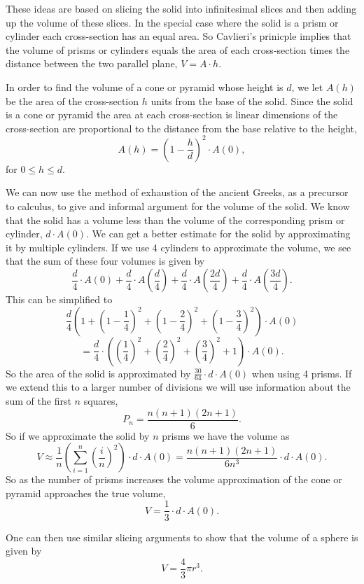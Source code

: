 \documentclass[
]{book}
\theoremstyle{definition}
\theoremstyle{definition}
\theoremstyle{definition}
\theoremstyle{definition}
\theoremstyle{remark}
\begin{document}
These ideas are based on slicing the solid into infinitesimal slices and then adding up the volume of these slices. In the special case where the solid is a prism or cylinder each cross-section has an equal area. So Cavlieri's prinicple implies that the volume of prisms or cylinders equals the area of each cross-section times the distance between the two parallel plane, \(V= A \cdot h\).

In order to find the volume of a cone or pyramid whose height is \(d\), we let \(A(h)\) be the area of the cross-section \(h\) units from the base of the solid. Since the solid is a cone or pyramid the area at each cross-section is linear dimensions of the cross-section are proportional to the distance from the base relative to the height, \[A(h) = \left( 1 - \frac{h}{d}\right)^2 \cdot A(0),\] for \(0\leq h \leq d\).

We can now use the method of exhaustion of the ancient Greeks, as a precursor to calculus, to give and informal argument for the volume of the solid. We know that the solid has a volume less than the volume of the corresponding prism or cylinder, \(d \cdot A(0)\). We can get a better estimate for the solid by approximating it by multiple cylinders. If we use 4 cylinders to approximate the volume, we see that the sum of these four volumes is given by
\[\frac{d}{4} \cdot A(0) + \frac{d}{4} \cdot A\left(\frac{d}{4}\right) + \frac{d}{4} \cdot A\left(\frac{2d}{4}\right) + \frac{d}{4} \cdot A\left(\frac{3d}{4}\right).\]
This can be simplified to
\[\frac{d}{4} \left( 1+\left(1-\frac{1}{4}\right)^2 + \left(1-\frac{2}{4}\right)^2 + \left(1-\frac{3}{4}\right)^2 \right) \cdot A(0)\]
\[= \frac{d}{4} \cdot \left( \left(\frac{1}{4}\right)^2 + \left(\frac{2}{4}\right)^2 + \left(\frac{3}{4}\right)^2+1\right) \cdot A(0).\]
So the area of the solid is approximated by \(\frac{30}{64} \cdot d \cdot A(0)\) when using 4 prisms. If we extend this to a larger number of divisions we will use information about the sum of the first \(n\) squares, \[P_n = \frac{n(n+1)(2n+1)}{6}.\] So if we approximate the solid by \(n\) prisms we have the volume as
\[ V \approx \frac{1}{n} \left(\sum_{i=1}^n \left( \frac{i}{n}\right)^2 \right) \cdot d \cdot A(0) = \frac{n(n+1)(2n+1)}{6n^3} \cdot d \cdot A(0).\] So as the number of prisms increases the volume approximation of the cone or pyramid approaches the true volume, \[V=\frac{1}{3} \cdot d \cdot A(0).\]

One can then use similar slicing arguments to show that the volume of a sphere is given by
\[V = \frac{4}{3} \pi r^3.\]
\end{document}
